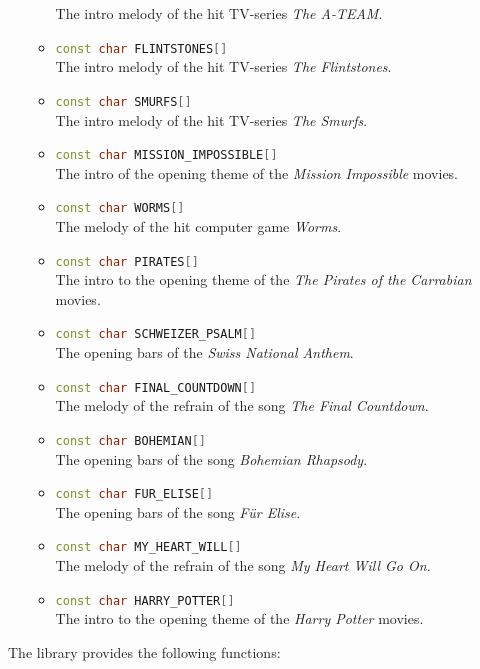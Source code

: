 \documentclass{report}
\begin{document}
\begin{itemize}
\begin{itemize}
				The intro melody of the hit TV-series \emph{The A-TEAM}.
			\item \lstinline[language=c++]{const char FLINTSTONES[]} \\
				The intro melody of the hit TV-series \emph{The Flintstones}.
			\item \lstinline[language=c++]{const char SMURFS[]} \\
				The intro melody of the hit TV-series \emph{The Smurfs}.
			\item \lstinline[language=c++]{const char MISSION_IMPOSSIBLE[]} \\
				The intro of the opening theme of the \emph{Mission Impossible} movies.
			\item \lstinline[language=c++]{const char WORMS[]} \\
				The melody of the hit computer game \emph{Worms}.
			\item \lstinline[language=c++]{const char PIRATES[]} \\
				The intro to the opening theme of the \emph{The Pirates of the Carrabian} movies.
			\item \lstinline[language=c++]{const char SCHWEIZER_PSALM[]} \\
				The opening bars of the \emph{Swiss National Anthem}.
			\item \lstinline[language=c++]{const char FINAL_COUNTDOWN[]} \\
				The melody of the refrain of the song \emph{The Final Countdown}.
			\item \lstinline[language=c++]{const char BOHEMIAN[]} \\
				The opening bars of the song \emph{Bohemian Rhapsody}.
			\item \lstinline[language=c++]{const char FUR_ELISE[]} \\
				The opening bars of the song \emph{Für Elise}.
			\item \lstinline[language=c++]{const char MY_HEART_WILL[]} \\
				The melody of the refrain of the song \emph{My Heart Will Go On}.
			\item \lstinline[language=c++]{const char HARRY_POTTER[]} \\
				The intro to the opening theme of the \emph{Harry Potter} movies.
		\end{itemize}
\end{itemize}
The library provides the following functions:
\end{document}
